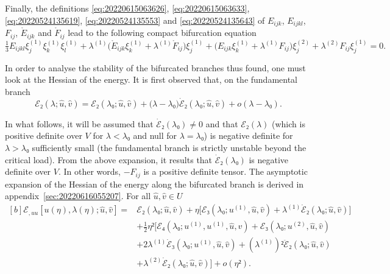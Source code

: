 \documentclass[12pt, final]{scrartcl}
\theoremstyle{definition}
\newcommand{\E}{\mathcal E}
\newcommand{\order}[2][1]{#2^{(#1)}}
\begin{document}
Finally, the definitions \eqref{eq:20220615063626}, \eqref{eq:20220615063633},
\eqref{eq:20220524135619}, \eqref{eq:20220524135553} and
\eqref{eq:20220524135643} of $E_{ijk}$, $E_{ijkl}$, $F_{ij}$,
$\mathring{E}_{ijk}$ and $\mathring{F}_{ij}$ lead to the following compact
bifurcation equation
\begin{equation}
  \label{eq:20220601070917}
  \tfrac{1}{3} E_{ijkl} \order[1]{ξ_j} \order[1]{ξ_k} \order[1]{ξ_l} + \order[1]\lambda \bigl( \mathring{E}_{ijk} \order[1]{ξ_k} + \order[1]\lambda \mathring{F}_{ij} \bigr)\order[1]{ξ_j} + \bigl(E_{ijk} \order[1]{ξ_k} + \order[1]\lambda F_{ij}\bigr) \order[2]{ξ_j} + \order[2]\lambda F_{ij} \order[1]{ξ_j} = 0.
\end{equation}

In order to analyse the stability of the bifurcated branches thus found, one
must look at the Hessian of the energy. It is first observed that, on the
fundamental branch
\begin{equation}
 \E₂(\lambda; \hat{u}, \hat{v}) = \E₂(\lambda₀; \hat{u}, \hat{v}) + \bigl(\lambda - \lambda₀\bigr) \dot{\E}₂(\lambda₀; \hat{u}, \hat{v}) + o(\lambda - \lambda₀).
\end{equation}

In what follows, it will be assumed that $\dot{\E}₂(\lambda₀)≠0$ and that $\E₂(\lambda)$
(which is positive definite over $V$ for $\lambda<\lambda₀$ and null for $\lambda=\lambda₀$) is
negative definite for $\lambda>\lambda₀$ sufficiently small (the fundamental branch is
strictly unstable beyond the critical load). From the above expansion, it
results that $\dot{\E}₂(\lambda₀)$ is negative definite over $V$. In other words,
$-F_{ij}$ is a positive definite tensor. The asymptotic expansion of the
Hessian of the energy along the bifurcated branch is derived in
appendix~\ref{sec:20220616055207}. For all $\hat{u}, \hat{v}∈U$
\begin{equation}
  \label{eq:20220531054247}
  \begin{aligned}[b]
    \E_{, uu}[u(η), \lambda(η); \hat{u}, \hat{v}] ={}
    & \E₂(\lambda₀ ; \hat{u}, \hat{v}) + η \bigl[\E₃(\lambda₀ ; \order[1]u, \hat{u}, \hat{v})  + \order[1]\lambda \dot{\E}₂(\lambda₀; \hat{u}, \hat{v})\bigr]\\
    &+ \tfrac{1}{2} η² \bigl[\E₄(\lambda₀; \order[1]u, \order[1]u, \hat{u}, \hat{v}) + \E₃(\lambda₀; \order[2]u, \hat{u}, \hat{v})\\
    & + 2\order[1]\lambda \dot{\E}₃(\lambda₀; \order[1]u, \hat{u}, \hat{v}) + ( \order[1]\lambda )² \ddot{\E}₂(\lambda₀; \hat{u}, \hat{v})\\
    & + \order[2]\lambda \dot{\E}₂(\lambda₀; \hat{u}, \hat{v}) \bigr] + o(η²).
  \end{aligned}
\end{equation}
\end{document}
